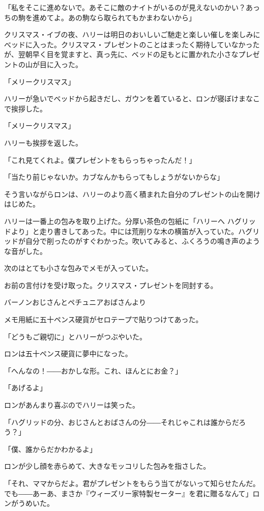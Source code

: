 \documentclass[10pt,a4paper]{article}
\begin{document}
\begin{CJK}{UTF8}{min}
「私をそこに進めないで。あそこに敵のナイトがいるのが見えないのかい？あっちの駒を進めてよ。あの駒なら取られてもかまわないから」

クリスマス・イブの夜、ハリーは明日のおいしいご馳走と楽しい催しを楽しみにべッドに入った。クリスマス・プレゼントのことはまったく期待していなかったが、翌朝早く目を覚ますと、真っ先に、ベッドの足もとに置かれた小さなプレゼントの山が目に入った。

「メリークリスマス」

ハリーが急いでベッドから起きだし、ガウンを着ていると、ロンが寝ぼけまなこで挨拶した。

「メリークリスマス」

ハリーも挨拶を返した。

「これ見てくれよ。僕プレゼントをもらっちゃったんだ！」

「当たり前じゃないか。カブなんかもらってもしょうがないからな」

そう言いながらロンは、ハリーのより高く積まれた自分のプレゼントの山を開けはじめた。

ハリーは一番上の包みを取り上げた。分厚い茶色の包紙に「ハリーへ  ハグリッドより」と走り書きしてあった。中には荒削りな木の横笛が入っていた。ハグリッドが自分で削ったのがすぐわかった。吹いてみると、ふくろうの鳴き声のような音がした。

次のはとても小さな包みでメモが入っていた。



お前の言付けを受け取った。クリスマス・プレゼントを同封する。

バーノンおじさんとペチュニアおばさんより



メモ用紙に五十ペンス硬貨がセロテープで貼りつけてあった。

「どうもご親切に」とハリーがつぶやいた。

ロンは五十ペンス硬貨に夢中になった。

「へんなの！――おかしな形。これ、ほんとにお金？」

「あげるよ」

ロンがあんまり喜ぶのでハリーは笑った。

「ハグリッドの分、おじさんとおばさんの分――それじゃこれは誰からだろう？」

「僕、誰からだかわかるよ」

ロンが少し顔を赤らめて、大きなモッコリした包みを指さした。

「それ、ママからだよ。君がプレゼントをもらう当てがないって知らせたんだ。でも――あーあ、まさか『ウィーズリー家特製セーター』を君に贈るなんて」ロンがうめいた。


\end{CJK}
\end{document}
